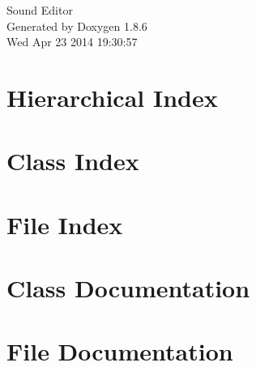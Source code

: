 \documentclass[twoside]{book}
\newcommand{\clearemptydoublepage}{%
  \newpage{\pagestyle{empty}\cleardoublepage}%
}
\begin{document}
\hypersetup{pageanchor=false}
\begin{titlepage}
\vspace*{7cm}
\begin{center}%
{\Large Sound Editor }\\
\vspace*{1cm}
{\large Generated by Doxygen 1.8.6}\\
\vspace*{0.5cm}
{\small Wed Apr 23 2014 19:30:57}\\
\end{center}
\end{titlepage}
\clearemptydoublepage
\tableofcontents
\clearemptydoublepage
{}
\hypersetup{pageanchor=true}

\chapter{Hierarchical Index}

\chapter{Class Index}

\chapter{File Index}

\chapter{Class Documentation}













\chapter{File Documentation}











\newpage
{}
{}
\printindex
\end{document}
